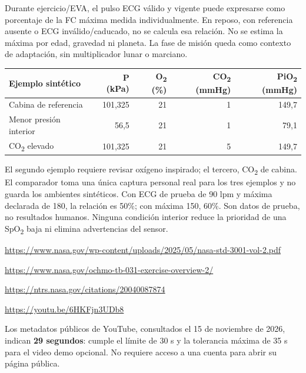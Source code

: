 Durante ejercicio/EVA, el pulso ECG válido y vigente puede expresarse como porcentaje de la FC máxima medida individualmente. En reposo, con referencia ausente o ECG inválido/caducado, no se calcula esa relación. No se estima la máxima por edad, gravedad ni planeta. La fase de misión queda como contexto de adaptación, sin multiplicador lunar o marciano.
\begin{tabularx}{\linewidth}{@{}Xrrrr@{}}\toprule
Ejemplo sintético & P (kPa) & O\textsubscript{2} (\%) & CO\textsubscript{2} (mmHg) & PiO\textsubscript{2} (mmHg)\\\midrule
Cabina de referencia &101,325&21&1&149,7\\
Menor presión interior &56,5&21&1&79,1\\
CO\textsubscript{2} elevado &101,325&21&5&149,7\\\bottomrule\end{tabularx}
El segundo ejemplo requiere revisar oxígeno inspirado; el tercero, CO\textsubscript{2} de cabina. El comparador toma una única captura personal real para los tres ejemplos y no guarda los ambientes sintéticos. Con ECG de prueba de 90 lpm y máxima declarada de 180, la relación es 50\%; con máxima 150, 60\%. Son datos de prueba, no resultados humanos. Ninguna condición interior reduce la prioridad de una SpO\textsubscript{2} baja ni elimina advertencias del sensor.
{\footnotesize\url{https://www.nasa.gov/wp-content/uploads/2025/05/nasa-std-3001-vol-2.pdf}\par
\url{https://www.nasa.gov/ochmo-tb-031-exercise-overview-2/}\par
\url{https://ntrs.nasa.gov/citations/20040087874}}
\url{https://youtu.be/6HKFjn3UDb8}\par
Los metadatos públicos de YouTube, consultados el 15 de noviembre de 2026, indican \textbf{29 segundos}: cumple el límite de 30 s y la tolerancia máxima de 35 s para el video demo opcional. No requiere acceso a una cuenta para abrir su página pública.
